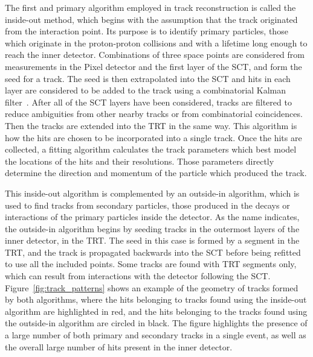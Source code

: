 The first and primary algorithm employed in track reconstruction is called the inside-out method, which begins with the assumption that the track originated from the interaction point.
Its purpose is to identify primary particles, those which originate in the proton-proton collisions and with a lifetime long enough to reach the inner detector.
Combinations of three space points are considered from measurements in the Pixel detector and the first layer of the \ac{SCT}, and form the seed for a track. 
The seed is then extrapolated into the \ac{SCT} and hits in each layer are considered to be added to the track using a combinatorial Kalman filter~\cite{tracking_performance}.
After all of the \ac{SCT} layers have been considered, tracks are filtered to reduce ambiguities from other nearby tracks or from combinatorial coincidences.
Then the tracks are extended into the \ac{TRT} in the same way.
This algorithm is how the hits are chosen to be incorporated into a single track.
Once the hits are collected, a fitting algorithm calculates the track parameters which best model the locations of the hits and their resolutions.
Those parameters directly determine the direction and momentum of the particle which produced the track.

This inside-out algorithm is complemented by an outside-in algorithm, which is used to find tracks from secondary particles, those produced in the decays or interactions of the primary particles inside the detector. 
As the name indicates, the outside-in algorithm begins by seeding tracks in the outermost layers of the inner detector, in the \ac{TRT}. 
The seed in this case is formed by a segment in the \ac{TRT}, and the track is propagated backwards into the \ac{SCT} before being refitted to use all the included points.
Some tracks are found with \ac{TRT} segments only, which can result from interactions with the detector following the \ac{SCT}.
Figure~\ref{fig:track_patterns} shows an example of the geometry of tracks formed by both algorithms, where the hits belonging to tracks found using the inside-out algorithm are highlighted in red, and the hits belonging to the tracks found using the outside-in algorithm are circled in black.
The figure highlights the presence of a large number of both primary and secondary tracks in a single event, as well as the overall large number of hits present in the inner detector.

